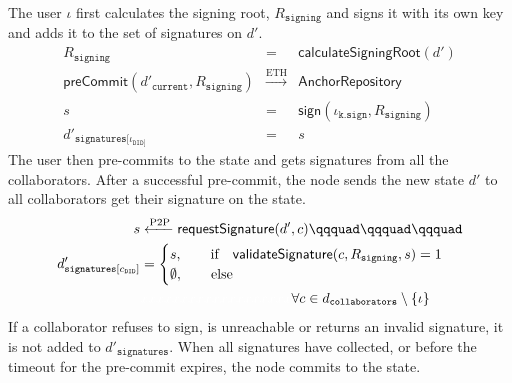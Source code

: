 The user $\iota$ first calculates the signing root, $R_{\mathtt{signing}}$ and signs it with its own key and adds it to the set of signatures on $d'$.
\begin{eqnarray}
    R_{\mathtt{signing}} & = & \mathsf{calculateSigningRoot}(d') \\
        \mathsf{preCommit}(d'_\mathtt{current},R_{\mathtt{signing}}) &\xrightarrow[]{\text{ETH}} &  \mathsf{AnchorRepository} \\
     s & = & \mathsf{sign}(\iota_{\mathtt{k.sign}}, R_{\mathtt{signing}}) \\
    {d'}_{\mathtt{signatures}[\iota_{\mathtt{DID}]}} & = & s
\end{eqnarray}
The user then pre-commits to the state and gets signatures from all the collaborators. After a successful pre-commit, the node sends the new state $d'$ to all collaborators get their signature on the state.
\begin{equation}
\begin{split}
s & \xleftarrow[]{\text{P2P}} \mathsf{requestSignature}(d', c) \qqquad \qqquad \qqquad \\
d'_{\mathtt{signatures}[c_{\mathtt{DID}}]} & =  \begin{cases}
  s, \quad \quad \text{if} \quad \mathsf{validateSignature}(c, R_{\mathtt{signing}}, s)  = 1 \\      
  \emptyset,  \quad\quad\text{else} \\
\end{cases} \\ 
& \textcolor{white}{xxxxxxxxxxxxxxxxxxx}\forall c \in d_{\mathtt{collaborators}} \setminus \{\iota\} %
\end{split}
\end{equation}
If a collaborator refuses to sign, is unreachable or returns an invalid signature, it is not added to $d'_{\mathtt{signatures}}$. When all signatures have collected, or before the timeout for the pre-commit expires, the node commits to the state.
\begin{comment}
\begin{eqnarray}
    R_{\mathtt{doc-root}} = \mathsf{calculateDocumentRoot}(d') \\
    \mathsf{commit}(d'_{\mathtt{next-img}}, R_{\mathtt{doc-root}},M_{\texttt{proofs}}) \xrightarrow[]{\text{ETH}} \mathsf{AnchorRepository}
\end{eqnarray}
\end{comment}
